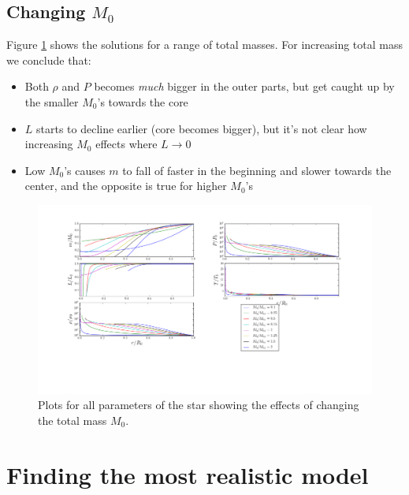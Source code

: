 \documentclass[11pt,twocolumn]{article}
\begin{document}
\subsection{Changing $M_0$}
Figure \ref{fig:M-variation} shows the solutions for a range of total
masses. For increasing total mass we conclude that:

\begin{itemize}
  \item Both $\rho$ and $P$ becomes \emph{much} bigger in the outer
    parts, but get caught up by the smaller $M_0$'s towards the core
  \item $L$ starts to decline earlier (core becomes bigger), but it's
    not clear how increasing $M_0$ effects where $L\rightarrow 0$
  \item Low $M_0$'s causes $m$ to fall of faster in the beginning and
    slower towards the center, and the opposite is true for higher $M_0$'s
\end{itemize}

\begin{figure}[ht]
  \centering
  \includegraphics[width=\linewidth]{fig/M_variation.png}
  \caption{\label{fig:M-variation} Plots for all parameters of the star
  showing the effects of changing the total mass $M_0$.}
\end{figure}


\section{Finding the most realistic model}
\end{document}
